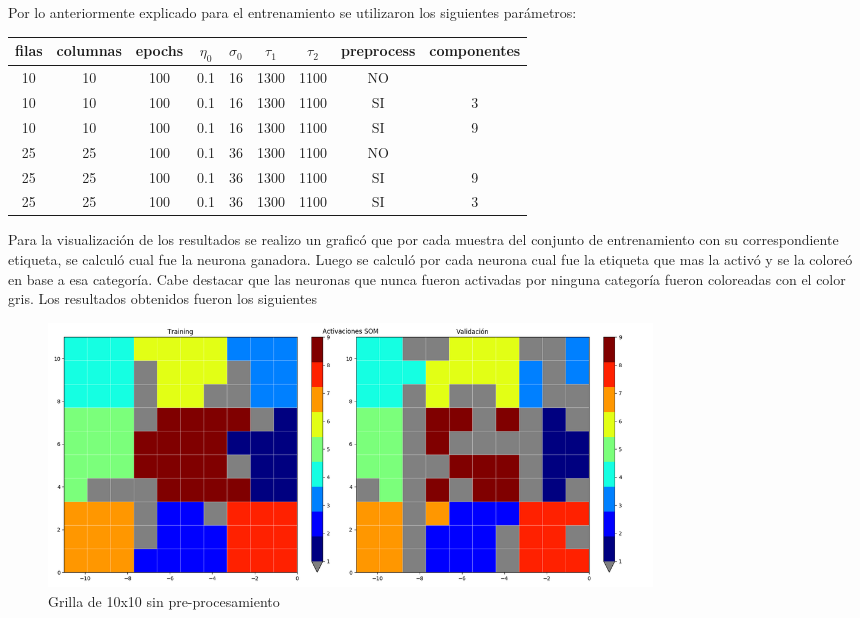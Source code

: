 Por lo anteriormente explicado para el entrenamiento se utilizaron los
siguientes parámetros:
\begin{center}
  \begin{tabular}{|c|c|c|c|c|c|c|c|c|}
    \hline
    filas & columnas & epochs & $\eta_0$ & $\sigma_0$ & $\tau_1$ & $\tau_2$ & preprocess & componentes \\
    \hline
	10 & 10 & 100 & 0.1 & 16 & 1300 & 1100 & NO & \ \\
    \hline
	10 & 10 & 100 & 0.1 & 16 & 1300 & 1100 & SI & 3 \\
    \hline
	10 & 10 & 100 & 0.1 & 16 & 1300 & 1100 & SI & 9 \\
    \hline
	25 & 25 & 100 & 0.1 & 36 & 1300 & 1100 & NO & \  \\
    \hline
	25 & 25 & 100 & 0.1 & 36 & 1300 & 1100 & SI & 9  \\
    \hline
  25 & 25 & 100 & 0.1 & 36 & 1300 & 1100 & SI & 3  \\
    \hline
  \end{tabular}
\end{center}

Para la visualización de los resultados se realizo un graficó que por cada
muestra del conjunto de entrenamiento con su correspondiente etiqueta, se
calculó cual fue la neurona ganadora. Luego se calculó por cada neurona cual
fue la etiqueta que mas la activó y se la coloreó en base a esa categoría. Cabe
destacar que las neuronas que nunca fueron activadas por ninguna categoría
fueron coloreadas con el color gris.  Los resultados obtenidos fueron los
siguientes

\begin{figure}[H]
  \includegraphics[width=160mm]{imagenes/som_10_10.png}
  \caption{Grilla de 10x10 sin pre-procesamiento}
\end{figure}

